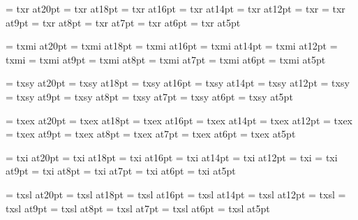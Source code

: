 
\font\twentyrm=     txr at20pt
\font\eighteenrm=   txr at18pt
\font\sixteenrm=    txr at16pt
\font\fourteenrm=   txr at14pt
\font\twelverm=     txr at12pt
\font\tenrm=        txr
\font\ninerm=       txr at9pt
\font\eightrm=      txr at8pt
\font\sevenrm=      txr at7pt
\font\sixrm=        txr at6pt
\font\fiverm=       txr at5pt

\font\twentyi=      txmi at20pt
\font\eighteeni=    txmi at18pt
\font\sixteeni=     txmi at16pt
\font\fourteeni=    txmi at14pt
\font\twelvei=      txmi at12pt
\font\teni=         txmi
\font\ninei=        txmi at9pt
\font\eighti=       txmi at8pt
\font\seveni=       txmi at7pt
\font\sixi=         txmi at6pt
\font\fivei=        txmi at5pt

\font\twentysy=     txsy at20pt
\font\eighteensy=   txsy at18pt
\font\sixteensy=    txsy at16pt
\font\fourteensy=   txsy at14pt
\font\twelvesy=     txsy at12pt
\font\tensy=        txsy
\font\ninesy=       txsy at9pt
\font\eightsy=      txsy at8pt
\font\sevensy=      txsy at7pt
\font\sixsy=        txsy at6pt
\font\fivesy=       txsy at5pt

\font\twentyex=     txex at20pt
\font\eighteenex=   txex at18pt
\font\sixteenex=    txex at16pt
\font\fourteenex=   txex at14pt
\font\twelveex=     txex at12pt
\font\tenex=        txex
\font\nineex=       txex at9pt
\font\eightex=      txex at8pt
\font\sevenex=      txex at7pt
\font\sixex=        txex at6pt
\font\fiveex=       txex at5pt

\font\twentyit=     txi at20pt
\font\eighteenit=   txi at18pt
\font\sixteenit=    txi at16pt
\font\fourteenit=   txi at14pt
\font\twelveit=     txi at12pt
\font\tenit=        txi
\font\nineit=       txi at9pt
\font\eightit=      txi at8pt
\font\sevenit=      txi at7pt
\font\sixit=        txi at6pt
\font\fiveit=       txi at5pt

\font\twentysl=     txsl at20pt
\font\eighteensl=   txsl at18pt
\font\sixteensl=    txsl at16pt
\font\fourteensl=   txsl at14pt
\font\twelvesl=     txsl at12pt
\font\tensl=        txsl
\font\ninesl=       txsl at9pt
\font\eightsl=      txsl at8pt
\font\sevensl=      txsl at7pt
\font\sixsl=        txsl at6pt
\font\fivesl=       txsl at5pt

